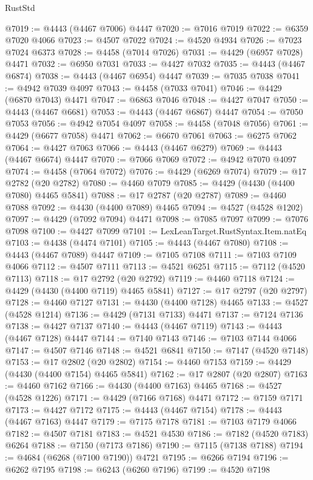 \begin{lexlean}{RustStd}
\begin{coremodule}
@7019 := @4443 (@4467 @7006) @4447
@7020 := @7016 @7019
@7022 := @6359 @7020 @4066
@7023 := @4507 @7022
@7024 := @4520 @4934
@7026 := @7023 @7024 @6373
@7028 := @4458 (@7014 @7026)
@7031 := @4429 (@6957 @7028) @4471
@7032 := @6950 @7031
@7033 := @4427 @7032
@7035 := @4443 (@4467 @6874)
@7038 := @4443 (@4467 @6954) @4447
@7039 := @7035 @7038
@7041 := @4942 @7039 @4097
@7043 := @4458 (@7033 @7041)
@7046 := @4429 (@6870 @7043) @4471
@7047 := @6863 @7046
@7048 := @4427 @7047
@7050 := @4443 (@4467 @6681)
@7053 := @4443 (@4467 @6867) @4447
@7054 := @7050 @7053
@7056 := @4942 @7054 @4097
@7058 := @4458 (@7048 @7056)
@7061 := @4429 (@6677 @7058) @4471
@7062 := @6670 @7061
@7063 := @6275 @7062
@7064 := @4427 @7063
@7066 := @4443 (@4467 @6279)
@7069 := @4443 (@4467 @6674) @4447
@7070 := @7066 @7069
@7072 := @4942 @7070 @4097
@7074 := @4458 (@7064 @7072)
@7076 := @4429 (@6269 @7074)
@7079 := @17 @2782 (@20 @2782)
@7080 := @4460 @7079
@7085 := @4429 (@4430 (@4400 @7080) @4465 @5841)
@7088 := @17 @2787 (@20 @2787)
@7089 := @4460 @7088
@7092 := @4430 (@4400 @7089) @4465
@7094 := @4527 (@4528 @1202)
@7097 := @4429 (@7092 @7094) @4471
@7098 := @7085 @7097
@7099 := @7076 @7098
@7100 := @4427 @7099
@7101 := LexLeanTarget.RustSyntax.Item.natEq
@7103 := @4438 (@4474 @7101)
@7105 := @4443 (@4467 @7080)
@7108 := @4443 (@4467 @7089) @4447
@7109 := @7105 @7108
@7111 := @7103 @7109 @4066
@7112 := @4507 @7111
@7113 := @4521 @6251
@7115 := @7112 (@4520 @7113)
@7118 := @17 @2792 (@20 @2792)
@7119 := @4460 @7118
@7124 := @4429 (@4430 (@4400 @7119) @4465 @5841)
@7127 := @17 @2797 (@20 @2797)
@7128 := @4460 @7127
@7131 := @4430 (@4400 @7128) @4465
@7133 := @4527 (@4528 @1214)
@7136 := @4429 (@7131 @7133) @4471
@7137 := @7124 @7136
@7138 := @4427 @7137
@7140 := @4443 (@4467 @7119)
@7143 := @4443 (@4467 @7128) @4447
@7144 := @7140 @7143
@7146 := @7103 @7144 @4066
@7147 := @4507 @7146
@7148 := @4521 @6841
@7150 := @7147 (@4520 @7148)
@7153 := @17 @2802 (@20 @2802)
@7154 := @4460 @7153
@7159 := @4429 (@4430 (@4400 @7154) @4465 @5841)
@7162 := @17 @2807 (@20 @2807)
@7163 := @4460 @7162
@7166 := @4430 (@4400 @7163) @4465
@7168 := @4527 (@4528 @1226)
@7171 := @4429 (@7166 @7168) @4471
@7172 := @7159 @7171
@7173 := @4427 @7172
@7175 := @4443 (@4467 @7154)
@7178 := @4443 (@4467 @7163) @4447
@7179 := @7175 @7178
@7181 := @7103 @7179 @4066
@7182 := @4507 @7181
@7183 := @4521 @4530
@7186 := @7182 (@4520 @7183) @6264
@7188 := @7150 (@7173 @7186)
@7190 := @7115 (@7138 @7188)
@7194 := @4684 (@6268 (@7100 @7190)) @4721
@7195 := @6266 @7194
@7196 := @6262 @7195
@7198 := @6243 (@6260 @7196)
@7199 := @4520 @7198

\end{coremodule}
\end{lexlean}
